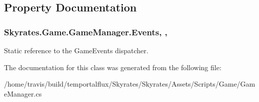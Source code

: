 \subsection{Property Documentation}
\hypertarget{class_skyrates_1_1_game_1_1_game_manager_acb90612bc562f5facb3218201154a35a}{
\subsubsection[{Events}]{ Skyrates.\-Game.\-Game\-Manager.\-Events\hspace{0.3cm}{\ttfamily [static]}, {\ttfamily [get]}, {\ttfamily [set]}}}\label{class_skyrates_1_1_game_1_1_game_manager_acb90612bc562f5facb3218201154a35a}


Static reference to the Game\-Events dispatcher. 



The documentation for this class was generated from the following file\-:\begin{DoxyCompactItemize}
\item 
/home/travis/build/temportalflux/\-Skyrates/\-Skyrates/\-Assets/\-Scripts/\-Game/Game\-Manager.\-cs\end{DoxyCompactItemize}
